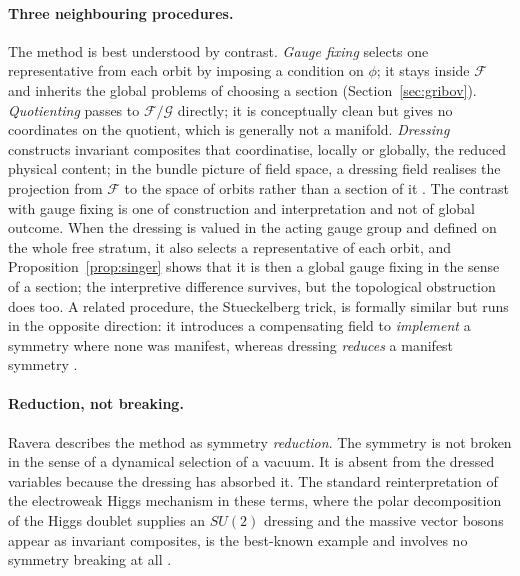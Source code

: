 \documentclass[11pt]{article}
\theoremstyle{plain}
\theoremstyle{definition}
\theoremstyle{remark}
\newcommand{\F}{\mathcal F}
\newcommand{\G}{\mathcal G}
\begin{document}
\paragraph{Three neighbouring procedures.} The method is best understood by contrast. \emph{Gauge fixing} selects one representative from each orbit by imposing a condition on $\phi$; it stays inside $\F$ and inherits the global problems of choosing a section (Section~\ref{sec:gribov}). \emph{Quotienting} passes to $\F/\G$ directly; it is conceptually clean but gives no coordinates on the quotient, which is generally not a manifold. \emph{Dressing} constructs invariant composites that coordinatise, locally or globally, the reduced physical content; in the bundle picture of field space, a dressing field realises the projection from $\F$ to the space of orbits rather than a section of it \cite{toe,fr-grf}. The contrast with gauge fixing is one of construction and interpretation and not of global outcome. When the dressing is valued in the acting gauge group and defined on the whole free stratum, it also selects a representative of each orbit, and Proposition~\ref{prop:singer} shows that it is then a global gauge fixing in the sense of a section; the interpretive difference survives, but the topological obstruction does too.
A related procedure, the Stueckelberg trick, is formally similar but runs in the opposite direction: it introduces a compensating field to \emph{implement} a symmetry where none was manifest, whereas dressing \emph{reduces} a manifest symmetry \cite{stueckelberg,toe}.

\paragraph{Reduction, not breaking.} Ravera describes the method as symmetry \emph{reduction}. The symmetry is not broken in the sense of a dynamical selection of a vacuum. It is absent from the dressed variables because the dressing has absorbed it. The standard reinterpretation of the electroweak Higgs mechanism in these terms, where the polar decomposition of the Higgs doublet supplies an $SU(2)$ dressing and the massive vector bosons appear as invariant composites, is the best-known example and involves no symmetry breaking at all \cite{berghofer-elements}.
\end{document}
